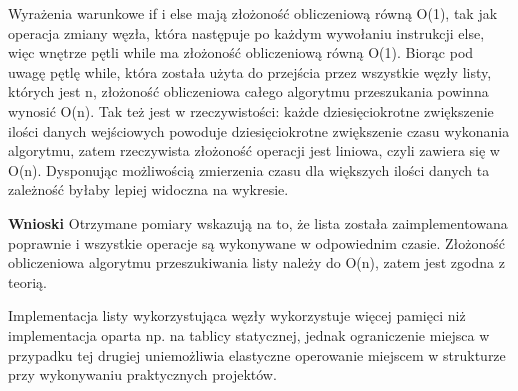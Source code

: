 \documentclass[10pt, a4paper]{article}
\begin{document}
\begin{flushleft}
Wyrażenia warunkowe if i else mają złożoność obliczeniową równą O(1), tak jak operacja zmiany węzła, która następuje po każdym wywołaniu instrukcji else, więc wnętrze pętli while ma złożoność obliczeniową równą O(1). Biorąc pod uwagę pętlę while, która została użyta do przejścia przez wszystkie węzły listy, których jest n, złożoność obliczeniowa całego algorytmu przeszukania powinna wynosić O(n). Tak też jest w rzeczywistości: każde dziesięciokrotne zwiększenie ilości danych wejściowych powoduje dziesięciokrotne zwiększenie czasu wykonania algorytmu, zatem rzeczywista złożoność operacji jest liniowa, czyli zawiera się w O(n). Dysponując możliwością zmierzenia czasu dla większych ilości danych ta zależność byłaby lepiej widoczna na wykresie.  \newline

\textbf{Wnioski} \newline \newline
Otrzymane pomiary wskazują na to, że lista została zaimplementowana poprawnie i wszystkie operacje są wykonywane w odpowiednim czasie. Złożoność obliczeniowa algorytmu przeszukiwania listy należy do O(n), zatem jest zgodna z teorią. \newline

Implementacja listy wykorzystująca węzły wykorzystuje więcej pamięci niż implementacja oparta np. na tablicy statycznej, jednak ograniczenie miejsca w przypadku tej drugiej uniemożliwia elastyczne operowanie miejscem w strukturze przy wykonywaniu praktycznych projektów. 

\end{flushleft}
\end{document}
